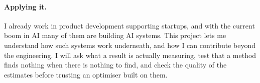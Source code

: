 \paragraph{Applying it.} I already work in product development supporting startups, and with the current boom in AI many of them are building AI systems. This project lets me understand how such systems work underneath, and how I can contribute beyond the engineering. I will ask what a result is actually measuring, test that a method finds nothing when there is nothing to find, and check the quality of the estimates before trusting an optimiser built on them.
